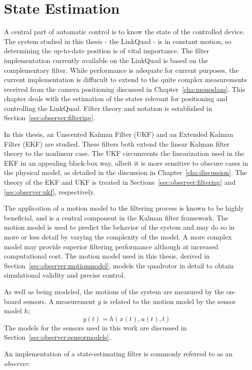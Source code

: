 \chapter{State Estimation}
\label{cha:observer}
    A central part of automatic control is to know the state of the controlled device.
    The system studied in this thesis - the LinkQuad - is in constant
    motion, so determining the up-to-date position is of vital importance.
    The filter implementation currently available on the LinkQuad is
    based on the complementary filter. While performance is adequate for
    current purposes, the current implementation is diffucult to extend
    to the quite complex measurements received from the camera positioning
    discussed in Chapter~\ref{cha:monoslam}.
    This chapter deals with the estimation of the states relevant for positioning
    and controlling the LinkQuad.
    Filter theory and notation is established in Section~\ref{sec:observer:filtering}.

    In this thesis, an Unscented Kalman Filter (UKF) and an Extended Kalman Filter (EKF) are studied.
    These filters both extend the linear Kalman filter theory to the nonlinear case.
    The UKF circumvents the linearization used in the EKF in an appealing black-box way,
    albeit it is more sensitive to obscure cases in the physical model,
    as detailed in the discussion in Chapter~\ref{cha:discussion}.
    The theory of the EKF and UKF is treated in
    Sections~\ref{sec:observer:filtering} and \ref{sec:observer:ukf}, respectively.

    The application of a motion model to the filtering process is known to
    be highly beneficial, and is a central component in the Kalman filter framework.
    The motion model is used to predict the behavior of the system and may do
    so in more or less detail by varying the complexity of the model.
    A more complex model may provide superior filtering performance although
    at increased computational cost. The motion model used in this thesis,
    derived in Section~\ref{sec:observer:motionmodel}, models the quadrotor
    in detail to obtain simulational validity and precise control.

    As well as being modeled, the motions of the system are measured by the on-board sensors.
    A measurement $y$ is related to the motion model by the sensor model $h$;
    \begin{equation}
        y(t) = h(x(t),u(t),t)
    \end{equation}
    The models for the sensors used in this work are discussed in Section~\ref{sec:observer:sensormodels}.

    An implementation of a state-estimating filter is commonly referred to as an \textit{observer}.

    
    
    
    
